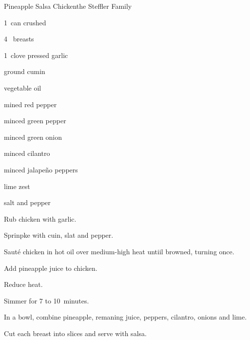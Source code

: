 \begin{recipe}{Pineapple Salsa Chicken}{the Steffler Family}{}

\begin{ingredients}
\item 1~can crushed 
\item 4~ breasts
\item 1~clove pressed garlic
\item {} ground cumin
\item {} vegetable oil
\item \C{\half} mined red pepper
\item \C{\quarter} minced green pepper
\item {} minced green onion
\item {} minced cilantro
\item {} minced jalape\~no peppers
\item {} lime zest
\item salt and pepper
\end{ingredients}

\begin{directions}
\item Rub chicken with garlic.
\item Sprinpke with cuin, slat and pepper.
\item Saut\'e chicken in hot oil over medium-high heat untiil browned, turning once.
\item Add \C{\half} pineapple juice to chicken.
\item Reduce heat.
\item Simmer for 7 to 10~minutes.
\item In a bowl, combine pineapple, remaning juice, peppers, cilantro, onions and lime.
\item Cut each breast into slices and serve with salsa.
\end{directions}
\end{recipe}

